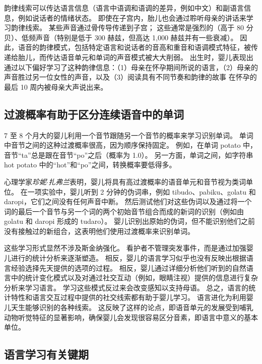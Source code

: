 韵律线索可以传达语言信息（语言中语调和语调的差异，例如中文）和副语言信息，例如说话者的情绪状态。
即使在子宫内，胎儿也会通过聆听母亲的讲话来学习韵律线索。 某些声音通过骨传导传递到子宫；
这些通常是强烈的（高于 80 分贝）、低频声音（特别是低于 300 赫兹，但高达 1,000 赫兹并有一些衰减）。
因此，语音的韵律模式，包括特定语言和说话者的音高和重音和语调模式特征，被传递给胎儿，而传达语音单元和单词的声音模式被大大削弱。
出生时，婴儿表现出通过以下偏好学习了这种韵律信息：（1）母亲在怀孕期间所说的语言，（2）母亲的声音胜过另一位女性的声音，以及（3）阅读具有不同节奏和韵律的故事 在怀孕的最后 10 周内被母亲大声说出来。



\subsection{过渡概率有助于区分连续语音中的单词}

7 至 8 个月大的婴儿利用一个音节跟随另一个音节的概率来学习识别单词。
单词中音节之间的这种过渡概率很高，因为顺序保持固定。
例如，在单词 potato 中，音节“ta”总是跟在音节“po”之后（概率为 1.0）。
另一方面，单词之间，如字符串 hot potato 中的“hot”和“po”之间，转换概率要低得多。


心理学家\textit{珍妮$\cdot$扎弗兰}表明，婴儿将具有高过渡概率的语音单元和音节视为类词单位。
在一项实验中，婴儿听到 2 分钟的伪词串，例如 tibudo、pabiku、golatu 和 daropi，它们之间没有任何声音中断。
然后测试他们对这些伪词以及通过将一个词的最后一个音节与另一个词的两个初始音节组合而成的新词的识别（例如由 golatu 和 daropi 形成的 tudaro）。
婴儿识别出原始的伪词，但不能识别他们之前没有接触过的新组合，这表明他们使用过渡概率来识别单词。


这些学习形式显然不涉及斯金纳强化。
看护者不管理突发事件，而是通过加强婴儿进行的统计分析来逐渐塑造。
相反，婴儿的语言学习似乎也没有反映出根据语言经验选择先天提供的选项的过程。
相反，婴儿通过详细分析他们听到的自然语言中的统计变化模式以及对通过社交互动（例如，眼睛注视）提供的信息进行复杂分析来学习语言。
学习这些模式反过来会改变感知以支持母语。
总之，语言的统计特性和语言交互过程中提供的社交线索都有助于婴儿学习。
语言进化为利用婴儿天生能够识别的各种线索。
这反映了这样的论点，即语音单元的发展受到哺乳动物听觉特征的显著影响，确保婴儿会发现很容易区分音素，即语言中意义的基本单位。



\subsection{语言学习有关键期}

